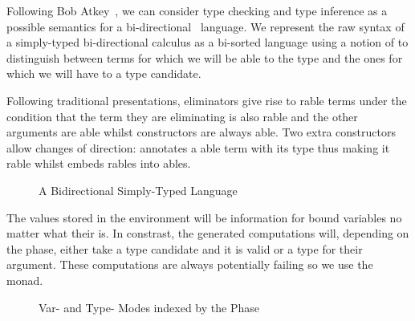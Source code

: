 Following Bob Atkey~\citeyear{atkey2015algebraic}, we can consider type checking
and type inference as a possible semantics for a bi-directional~\cite{pierce2000local}
language. We represent the raw syntax of a simply-typed bi-directional calculus
as a bi-sorted language using a notion of  to distinguish between terms
for which we will be able to  the type and the ones for which we will
have to  a type candidate.

Following traditional presentations, eliminators give rise to rable
terms under the condition that the term they are eliminating is also rable
and the other arguments are able whilst constructors are always able.
Two extra constructors allow changes of direction:  annotates a able
term with its type thus making it rable whilst  embeds rables
into ables.

\begin{figure}[h]
\begin{minipage}{0.35\textwidth}
\end{minipage}
\begin{minipage}{0.55\textwidth}
\end{minipage}
\caption{A Bidirectional Simply-Typed Language}
\end{figure}

The values stored in the environment will be  information for bound
variables no matter what their  is. In constrast, the generated
computations will, depending on the phase, either take a type candidate and
 it is valid or  a type for their argument. These
computations are always potentially failing so we use the  monad.

\begin{figure}[h]
\begin{minipage}{0.40\textwidth}
\end{minipage}
\begin{minipage}{0.50\textwidth}
\end{minipage}
\caption{Var- and Type- Modes indexed by the Phase}
\end{figure}

